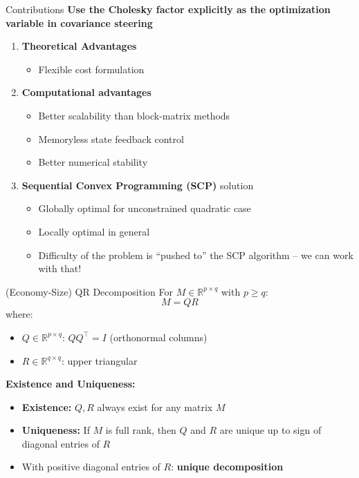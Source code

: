 \documentclass{beamer}
\begin{document}
\begin{frame}{Contributions}
\textbf{Use the Cholesky factor explicitly as the optimization variable in covariance steering}
\begin{enumerate}

    \item \textbf{Theoretical Advantages}
    \begin{itemize}
        \item Flexible cost formulation
    \end{itemize}
    
    \item \textbf{Computational advantages}
    \begin{itemize}
        \item Better scalability than block-matrix methods
        \item Memoryless state feedback control
        \item Better numerical stability
    \end{itemize}

    \item \textbf{Sequential Convex Programming (SCP)} solution
    \begin{itemize}
        \item Globally optimal for unconstrained quadratic case
        \item Locally optimal in general
        \item Difficulty of the problem is ``pushed to'' the SCP algorithm -- we can work with that!
    \end{itemize}
\end{enumerate}
\end{frame}



\begin{frame}{(Economy-Size) QR Decomposition}
For $M \in \mathbb{R}^{p \times q}$ with $p \geq q$:
\[
M = QR
\]
where:
\begin{itemize}
    \item $Q \in \mathbb{R}^{p \times q}$: $Q Q^\top = I$ (orthonormal columns)
    \item $R \in \mathbb{R}^{q \times q}$: upper triangular
\end{itemize}

\textbf{Existence and Uniqueness:}
\begin{itemize}
    \item \textbf{Existence:} $Q, R$ always exist for any matrix $M$
    \item \textbf{Uniqueness:} If $M$ is full rank, then $Q$ and $R$ are unique up to sign of diagonal entries of $R$
    \item With positive diagonal entries of $R$: \textbf{unique decomposition}
\end{itemize}
\end{frame}
\end{document}
